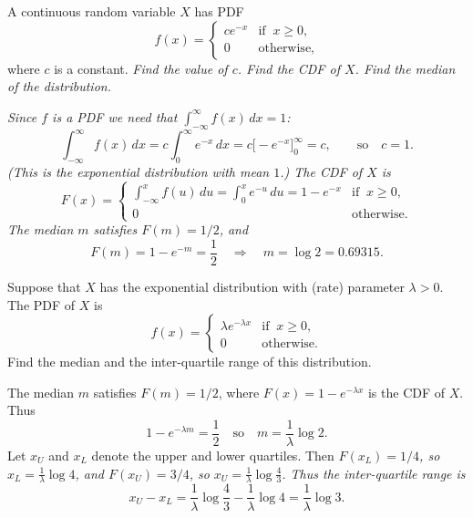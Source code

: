 \begin{exercise}
\begin{questions}
\question
A continuous random variable $X$ has PDF
\[
f(x) = \begin{cases}
	ce^{-x}	& \text{if }\ x\geq 0,\\
	0		& \text{otherwise,}		
\end{cases}
\]
where $c$ is a constant. 
\ben
\it Find the value of $c$.
\it Find the CDF of $X$.
\it Find the median of the distribution.
\een
\begin{answer}
\ben
\it %
Since $f$ is a PDF we need that $\int_{-\infty}^{\infty} f(x)\,dx = 1$:
\[
\int_{-\infty}^{\infty} f(x)\,dx 
	= c\int_0^{\infty} e^{-x}\,dx 
	= c\big[-e^{-x}\big]_0^{\infty}
	= c, \qquad\text{so}\quad c = 1.
\]
(This is the exponential distribution with mean $1$.)
\it %
The CDF of $X$ is
\[
F(x) = \begin{cases}
	\int_{-\infty}^{x} f(u)\,du = \int_0^x e^{-u}\,du = 1 - e^{-x}	& \text{if }\ x\geq 0, \\
	0	& \text{otherwise.}
\end{cases}
\]	
\it %
The median $m$ satisfies $F(m)=1/2$, and
\[
F(m) = 1 - e^{-m} = \frac{1}{2} \quad\Rightarrow\quad m = \log 2 = 0.69315.
\]
\een
\end{answer}


\question
Suppose that $X$ has the exponential distribution with (rate) parameter $\lambda>0$. The PDF of $X$ is
\[
f(x) = \begin{cases}
	\lambda e^{-\lambda x} 	& \text{if }\ x\geq 0,\\
	0		  				& \text{otherwise.}		
\end{cases}
\]
Find the median and the inter-quartile range of this distribution.

\begin{answer}
The median $m$ satisfies $F(m)=1/2$, where $F(x)=1-e^{-\lambda x}$ is the CDF of $X$. Thus
\[
1 - e^{-\lambda m} = \frac{1}{2}
\quad\text{so}\quad
m = \frac{1}{\lambda}\log 2.
\]
Let $x_U$ and $x_L$ denote the upper and lower quartiles. Then
\bit
\it $F(x_L) = 1/4$, so $x_L = \displaystyle\frac{1}{\lambda}\log 4$, and
\it $F(x_U) = 3/4$, so $x_U = \displaystyle\frac{1}{\lambda}\log \frac{4}{3}$.
\eit
Thus the inter-quartile range is 
\[
x_U - x_L 
	= \frac{1}{\lambda}\log \frac{4}{3} - \frac{1}{\lambda}\log 4
	= \frac{1}{\lambda}\log 3.
\]
\end{answer}


\end{questions}
\end{exercise}

\endinput
